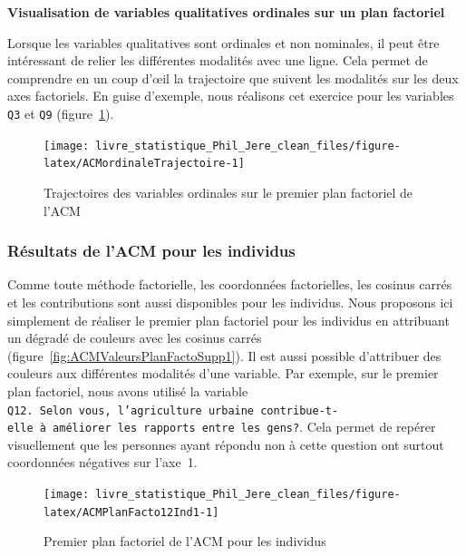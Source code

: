 \documentclass[
  11pt,
  french,
]{book}
\makeatletter
\newenvironment{kframev}{%
\medskip{}
\setlength{\fboxsep}{.8em}
 \def\at@end@of@kframev{}%
 \ifinner\ifhmode%
  \def\at@end@of@kframev{\end{minipage}}%
  \begin{minipage}{\columnwidth}%
 \fi\fi%
 \def\FrameCommand##1{\hskip\@totalleftmargin \hskip-\fboxsep
 \colorbox{shadebluecolor}{##1}\hskip-\fboxsep
     \hskip-\linewidth \hskip-\@totalleftmargin \hskip\columnwidth}%
 \MakeFramed {\advance\hsize-\width
   \@totalleftmargin\z@ \linewidth\hsize
   \@setminipage}}%
 {\par\unskip\endMakeFramed%
 \at@end@of@kframev}
\newenvironment{rmdblock}[1]
  {
  \begin{itemize}
  \renewcommand{\labelitemi}{
    \raisebox{-.7\height}[0pt][0pt]{
      {\setkeys{Gin}{width=3em,keepaspectratio}\texttt{[image: images/\#1]}}
    }
  }
  \setlength{\fboxsep}{1em}
  \begin{kframev}
  \small
  \item
  }
  {
  \end{kframev}
  \end{itemize}
  }
\newenvironment{bloc_astuce}
  {\begin{rmdblock}{astuce}}
  {\end{rmdblock}}
\makeatother
\begin{document}
\begin{bloc_astuce}

\textbf{Visualisation de variables qualitatives ordinales sur un plan factoriel}

Lorsque les variables qualitatives sont ordinales et non nominales, il peut être intéressant de relier les différentes modalités avec une ligne. Cela permet de comprendre en un coup d'œil la trajectoire que suivent les modalités sur les deux axes factoriels. En guise d'exemple, nous réalisons cet exercice pour les variables \texttt{Q3} et \texttt{Q9} (figure~\ref{fig:ACMordinaleTrajectoire}).

\begin{figure}

{\centering \texttt{[image: livre\_statistique\_Phil\_Jere\_clean\_files/figure-latex/ACMordinaleTrajectoire-1]} 

}

\caption{Trajectoires des variables ordinales sur le premier plan factoriel de l'ACM }\label{fig:ACMordinaleTrajectoire}
\end{figure}


\end{bloc_astuce}

\hypertarget{sect12413}{%
\subsubsection{Résultats de l'ACM pour les individus}\label{sect12413}}

Comme toute méthode factorielle, les coordonnées factorielles, les cosinus carrés et les contributions sont aussi disponibles pour les individus. Nous proposons ici simplement de réaliser le premier plan factoriel pour les individus en attribuant un dégradé de couleurs avec les cosinus carrés (figure~\ref{fig:ACMValeursPlanFactoSupp1}). Il est aussi possible d'attribuer des couleurs aux différentes modalités d'une variable. Par exemple, sur le premier plan factoriel, nous avons utilisé la variable \texttt{Q12.\ Selon\ vous,\ l’agriculture\ urbaine\ contribue-t-elle\ à\ améliorer\ les\ rapports\ entre\ les\ gens?}. Cela permet de repérer visuellement que les personnes ayant répondu non à cette question ont surtout coordonnées négatives sur l'axe~1.

\begin{figure}

{\centering \texttt{[image: livre\_statistique\_Phil\_Jere\_clean\_files/figure-latex/ACMPlanFacto12Ind1-1]} 

}

\caption{Premier plan factoriel de l'ACM pour les individus}\label{fig:ACMPlanFacto12Ind1}
\end{figure}
\end{document}
